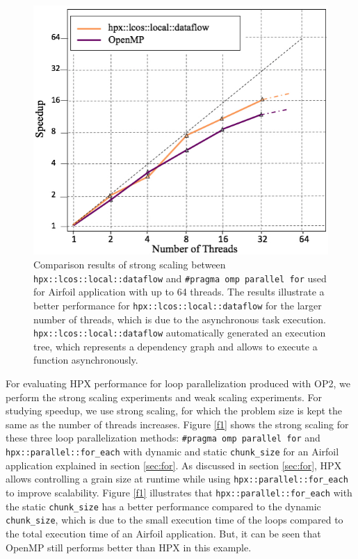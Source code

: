 \documentclass[conference]{IEEEtran}
\begin{document}
\begin{figure} 
\begin{center}
\centering
\includegraphics[width=1\columnwidth]{Pictures/dataflow.jpg}
\caption {\small{Comparison results of strong scaling between \texttt{hpx::lcos::local::dataflow} and \texttt{\#pragma omp parallel for} used for Airfoil application
with up to 64 threads. The results illustrate a better performance for \texttt{hpx::lcos::local::dataflow} for the larger number of threads, which is due to the asynchronous task execution. \texttt{hpx::lcos::local::dataflow} automatically generated an execution tree, which represents a dependency graph and allows to execute a function asynchronously. }}
\label{f2}
\end{center}
\end{figure}
 

For evaluating HPX performance for loop parallelization produced with OP2, we perform the strong scaling experiments and weak scaling experiments. For studying speedup, we use strong scaling, for which the problem size is kept the same as the number of threads increases. Figure \ref{f1} shows the strong scaling for these three loop parallelization methods: \texttt{\#pragma omp parallel for} and \texttt{hpx::parallel::for\_each} with dynamic and static \texttt{chunk\_size} for an Airfoil application explained in section \ref{sec:for}. As discussed in section \ref{sec:for}, HPX allows controlling a grain size at runtime while using \texttt{hpx::parallel::for\_each} to improve scalability. Figure \ref{f1} illustrates that \texttt{hpx::parallel::for\_each} with the static \texttt{chunk\_size} has a better performance compared to the dynamic \texttt{chunk\_size}, which is due to the small execution time of the loops compared to the total execution time of an Airfoil application. But, it can be seen that OpenMP still performs better than HPX in this example.
\end{document}
